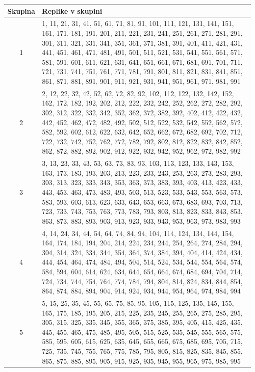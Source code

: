 \documentclass[a4paper, 12pt]{book}
\begin{document}
\begin{table}
\tiny
  \begin{center}
    \begin{tabulary}{1.0\textwidth}{C p{11.80cm}}
      {\scriptsize Skupina} & {\scriptsize Replike v skupini} \\
       & 1, 11, 21, 31, 41, 51, 61, 71, 81, 91, 101, 111, 121, 131, 141, 151, 161, 171, 181, 191, 201, 211, 221, 231, 241, 251, 261, 271, 281, 291, 301, 311, 321, 331, 341, 351, 361, 371, 381, 391, 401, 411, 421, 431, 441, 451, 461, 471, 481, 491, 501, 511, 521, 531, 541, 551, 561, 571, 581, 591, 601, 611, 621, 631, 641, 651, 661, 671, 681, 691, 701, 711, 721, 731, 741, 751, 761, 771, 781, 791, 801, 811, 821, 831, 841, 851, 861, 871, 881, 891, 901, 911, 921, 931, 941, 951, 961, 971, 981, 991 \\
      2 & 2, 12, 22, 32, 42, 52, 62, 72, 82, 92, 102, 112, 122, 132, 142, 152, 162, 172, 182, 192, 202, 212, 222, 232, 242, 252, 262, 272, 282, 292, 302, 312, 322, 332, 342, 352, 362, 372, 382, 392, 402, 412, 422, 432, 442, 452, 462, 472, 482, 492, 502, 512, 522, 532, 542, 552, 562, 572, 582, 592, 602, 612, 622, 632, 642, 652, 662, 672, 682, 692, 702, 712, 722, 732, 742, 752, 762, 772, 782, 792, 802, 812, 822, 832, 842, 852, 862, 872, 882, 892, 902, 912, 922, 932, 942, 952, 962, 972, 982, 992 \\
      3 & 3, 13, 23, 33, 43, 53, 63, 73, 83, 93, 103, 113, 123, 133, 143, 153, 163, 173, 183, 193, 203, 213, 223, 233, 243, 253, 263, 273, 283, 293, 303, 313, 323, 333, 343, 353, 363, 373, 383, 393, 403, 413, 423, 433, 443, 453, 463, 473, 483, 493, 503, 513, 523, 533, 543, 553, 563, 573, 583, 593, 603, 613, 623, 633, 643, 653, 663, 673, 683, 693, 703, 713, 723, 733, 743, 753, 763, 773, 783, 793, 803, 813, 823, 833, 843, 853, 863, 873, 883, 893, 903, 913, 923, 933, 943, 953, 963, 973, 983, 993 \\
      4 & 4, 14, 24, 34, 44, 54, 64, 74, 84, 94, 104, 114, 124, 134, 144, 154, 164, 174, 184, 194, 204, 214, 224, 234, 244, 254, 264, 274, 284, 294, 304, 314, 324, 334, 344, 354, 364, 374, 384, 394, 404, 414, 424, 434, 444, 454, 464, 474, 484, 494, 504, 514, 524, 534, 544, 554, 564, 574, 584, 594, 604, 614, 624, 634, 644, 654, 664, 674, 684, 694, 704, 714, 724, 734, 744, 754, 764, 774, 784, 794, 804, 814, 824, 834, 844, 854, 864, 874, 884, 894, 904, 914, 924, 934, 944, 954, 964, 974, 984, 994 \\
      5 & 5, 15, 25, 35, 45, 55, 65, 75, 85, 95, 105, 115, 125, 135, 145, 155, 165, 175, 185, 195, 205, 215, 225, 235, 245, 255, 265, 275, 285, 295, 305, 315, 325, 335, 345, 355, 365, 375, 385, 395, 405, 415, 425, 435, 445, 455, 465, 475, 485, 495, 505, 515, 525, 535, 545, 555, 565, 575, 585, 595, 605, 615, 625, 635, 645, 655, 665, 675, 685, 695, 705, 715, 725, 735, 745, 755, 765, 775, 785, 795, 805, 815, 825, 835, 845, 855, 865, 875, 885, 895, 905, 915, 925, 935, 945, 955, 965, 975, 985, 995 \\

\end{tabulary}
\end{center}
\end{table}
\end{document}

